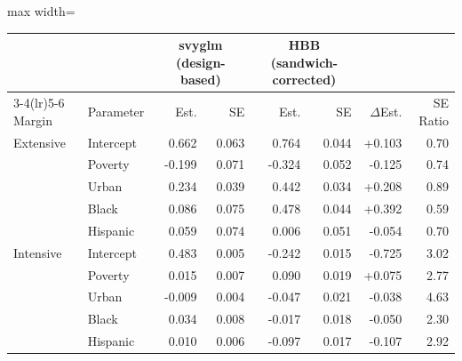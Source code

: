\small
\begin{adjustbox}{max width=\textwidth}
\begin{tabular}{@{}l l rr rr r r@{}}
\toprule
 & & \multicolumn{2}{c}{svyglm (design-based)} &
   \multicolumn{2}{c}{HBB (sandwich-corrected)} & & \\
\cmidrule(lr){3-4}\cmidrule(lr){5-6}
Margin & Parameter & Est. & SE & Est. & SE & $\Delta$Est. & SE Ratio \\
\midrule
Extensive & Intercept & 0.662 & 0.063 & 0.764 & 0.044 & +0.103 & 0.70 \\
 & Poverty & -0.199 & 0.071 & -0.324 & 0.052 & -0.125 & 0.74 \\
 & Urban & 0.234 & 0.039 & 0.442 & 0.034 & +0.208 & 0.89 \\
 & Black & 0.086 & 0.075 & 0.478 & 0.044 & +0.392 & 0.59 \\
 & Hispanic & 0.059 & 0.074 & 0.006 & 0.051 & -0.054 & 0.70 \\
[3pt]
Intensive & Intercept & 0.483 & 0.005 & -0.242 & 0.015 & -0.725 & 3.02 \\
 & Poverty & 0.015 & 0.007 & 0.090 & 0.019 & +0.075 & 2.77 \\
 & Urban & -0.009 & 0.004 & -0.047 & 0.021 & -0.038 & 4.63 \\
 & Black & 0.034 & 0.008 & -0.017 & 0.018 & -0.050 & 2.30 \\
 & Hispanic & 0.010 & 0.006 & -0.097 & 0.017 & -0.107 & 2.92 \\
\bottomrule
\end{tabular}
\end{adjustbox}
